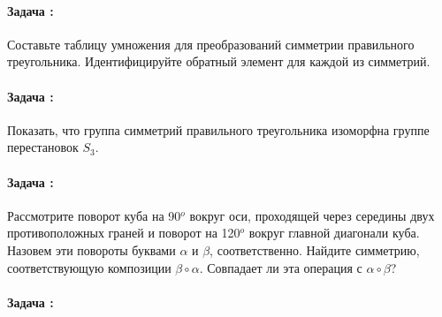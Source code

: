 \documentclass[amsmath,amssymb,12pt]{revtex4}
\newif\ifimportant
\newcommand{\1}{\frac{1}{2}}
\begin{document}
\addtocounter{prn}{1}
\vspace{0.3cm}
\paragraph*{Задача \theprn: }
%

Составьте таблицу умножения для преобразований симметрии правильного треугольника. Идентифицируйте обратный элемент для каждой из симметрий.






\addtocounter{prn}{1}
\vspace{0.3cm}
\paragraph*{Задача \theprn: }
%

Показать, что группа симметрий правильного треугольника изоморфна группе перестановок $S_{3}$. 

\ifimportant
\medskip
\noindent
Решение
Сравнить таблицы умножений двух групп.
\fi




\addtocounter{prn}{1}
\vspace{0.3cm}
\paragraph*{Задача \theprn: }

Рассмотрите поворот куба на 90$^{o}$ вокруг оси, проходящей через середины двух противоположных граней и поворот на 120$^{o}$ вокруг главной диагонали куба. Назовем эти повороты буквами $\alpha$ и $\beta$, соответственно. Найдите симметрию, соответствующую композиции $\beta\circ \alpha$. Совпадает ли эта операция с $\alpha\circ \beta$?


\ifimportant
\medskip
\noindent
ОТВЕТ: поворот на 180$^{o}$ вокруг оси, проходящей через середины противоположных ребер куба.  
\fi


\addtocounter{prn}{1}
\vspace{0.3cm}
\paragraph*{Задача \theprn: }
\end{document}
